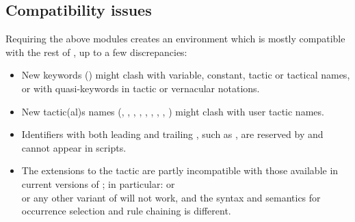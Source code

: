 \subsection{Compatibility issues}\label{sec:compat}
Requiring the above modules creates an environment which
is mostly compatible with the rest of \Coq{}, up to a few discrepancies:
\begin{itemize}
\item New keywords () might clash with variable, constant,
tactic or tactical names, or with quasi-keywords in tactic or
vernacular notations.
\item New tactic(al)s names (, , ,
  , ,
  , , , ) might clash
  with user tactic names.
\item Identifiers with both leading and trailing \ssrC{_}, such as ,
are reserved by \ssr{} and cannot appear in scripts.
\item The extensions to the  tactic are partly
incompatible with those available in current versions of \Coq{};
in particular:
 or \\  or any other
variant of  will not work, and the \ssr{} syntax and semantics for occurrence selection and
rule chaining is different.


\end{itemize}
